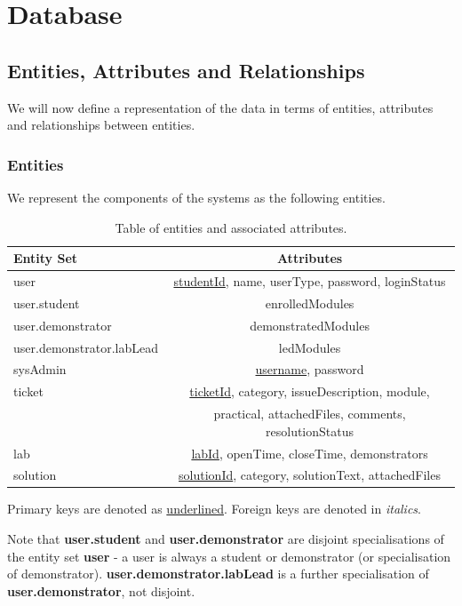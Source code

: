 \section{Database}

\subsection{Entities, Attributes and Relationships}
We will now define a representation of the data in terms of entities, attributes and relationships between entities.

\subsubsection{Entities}

We represent the components of the systems as the following entities. 

\FloatBarrier
\begin{table}[H]
\centering
\begin{tabular}{ |l|c| } 
 \hline
 \textbf{Entity Set} & \textbf{Attributes}\\ 
 \hline
  user & \underline{studentId}, name, userType, password, loginStatus\\ 
 \hspace{6pt}user.student & enrolledModules\\ 
 \hspace{6pt}user.demonstrator & demonstratedModules\\
 \hspace{12pt}user.demonstrator.labLead & ledModules\\
 sysAdmin & \underline{username}, password\\ 
 ticket & \underline{ticketId}, category, issueDescription, module,\\
 & practical, attachedFiles, comments, resolutionStatus \\
 lab & \underline{labId}, openTime, closeTime, demonstrators\\
 solution & \underline{solutionId}, category, solutionText, attachedFiles\\
 \hline
\end{tabular}
\caption{Table of entities and associated attributes.}
\end{table}
\FloatBarrier

Primary keys are denoted as \underline{underlined}. Foreign keys are denoted in \textit{italics}.

Note that \textbf{user.student} and \textbf{user.demonstrator} are disjoint specialisations of the entity set \textbf{user} - a user is always a student or demonstrator (or specialisation of demonstrator). \textbf{user.demonstrator.labLead} is a further specialisation of \textbf{user.demonstrator}, not disjoint. 

